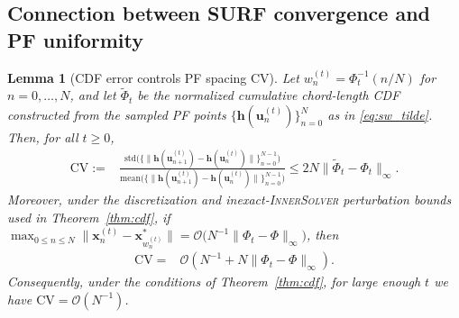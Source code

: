 \documentclass{article}
\newtheorem{lemma}{Lemma}
\newcommand{\Oc}{\mathcal{O}}
\newcommand{\bx}{\mathbf{x}}
\newcommand{\bu}{\mathbf{u}}
\newcommand{\h}{\mathbf{h}}
\begin{document}
\subsection{Connection between SURF convergence and PF uniformity}
\label{app:SURV_CV}
\begin{lemma}[CDF error controls PF spacing CV]
\label{lem:cv_cdf_error}
Let $w_n^{(t)}=\Phi_t^{-1}(n/N)$ for $n=0,\dots,N$, and let $\tilde\Phi_t$ be the normalized cumulative chord-length CDF constructed from the sampled PF points $\{\h(\bu_n^{(t)})\}_{n=0}^N$ as in \eqref{eq:sw_tilde}. Then, for all $t\geq0$,
\begin{align}
\mathrm{CV}
:=&\frac{\mathrm{std}\big(\{\|\h(\bu_{n+1}^{(t)})-\h(\bu_n^{(t)})\|\}_{n=0}^{N-1}\big)}
{\mathrm{mean}\big(\{\|\h(\bu_{n+1}^{(t)})-\h(\bu_n^{(t)})\|\}_{n=0}^{N-1}\big)}
\leq 2N\|\tilde\Phi_t-\Phi_t\|_\infty .
\end{align}
Moreover, under the discretization and inexact-\textsc{InnerSolver} perturbation bounds used in Theorem~\ref{thm:cdf}, if $\max_{0\le n\le N}\|\bx_n^{(t)}-\bx_{w_n^{(t)}}^*\|=\Oc\big(N^{-1}\|\Phi_t-\Phi\|_\infty\big)$, then
\begin{align}
\mathrm{CV}
=&\Oc\left(N^{-1}+N\|\Phi_t-\Phi\|_\infty\right).
\end{align}
Consequently, under the conditions of Theorem~\ref{thm:cdf}, for large enough $t$ we have $\mathrm{CV}=\Oc(N^{-1})$.
\end{lemma}
\end{document}
